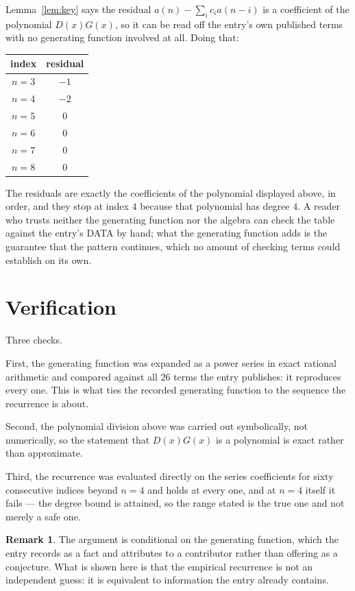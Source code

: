 \documentclass[11pt,a4paper]{article}
\theoremstyle{plain}
\theoremstyle{definition}
\newtheorem{remark}[theorem]{Remark}
\begin{document}
Lemma~\ref{lem:key} says the residual $a(n)-\sum_ic_ia(n-i)$ is a coefficient of the
polynomial $D(x)G(x)$, so it can be read off the entry's own published terms with no
generating function involved at all. Doing that:
\begin{center}
\begin{tabular}{cc}
index & residual \\ \hline
$n=3$ & $-1$ \\
$n=4$ & $-2$ \\
$n=5$ & $0$ \\
$n=6$ & $0$ \\
$n=7$ & $0$ \\
$n=8$ & $0$
\end{tabular}
\end{center}
The residuals are exactly the coefficients of the polynomial displayed above, in order, and
they stop at index $4$ because that polynomial has degree $4$. A reader who trusts
neither the generating function nor the algebra can check the table against the entry's DATA
by hand; what the generating function adds is the guarantee that the pattern continues, which
no amount of checking terms could establish on its own.

\section{Verification}

Three checks.

First, the generating function was expanded as a power series in exact rational arithmetic and
compared against all $26$ terms the entry publishes: it reproduces every one. This is
what ties the recorded generating function to the sequence the recurrence is about.

Second, the polynomial division above was carried out symbolically, not numerically, so the
statement that $D(x)G(x)$ is a polynomial is exact rather than approximate.

Third, the recurrence was evaluated directly on the series coefficients for sixty consecutive
indices beyond $n=4$ and holds at every one, and at $n=4$ itself it fails --- the
degree bound is attained, so the range stated is the true one and not merely a safe one.

\begin{remark}
The argument is conditional on the generating function, which the entry records as a fact and
attributes to a contributor rather than offering as a conjecture. What is shown here is that
the empirical recurrence is not an independent guess: it is equivalent to information the
entry already contains.
\end{remark}
\end{document}
